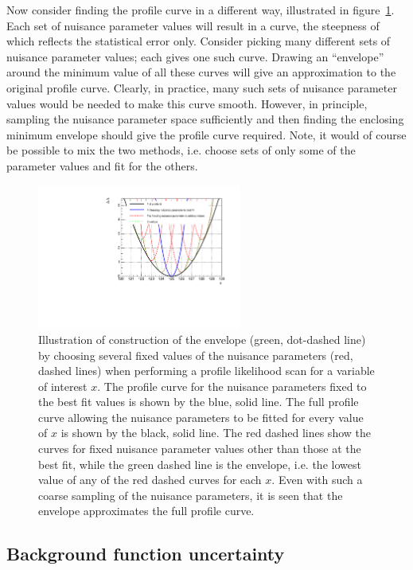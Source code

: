 Now consider finding the profile curve in a different way, illustrated
in figure~\ref{fig:concept:cartoon}.
Each set of nuisance
parameter values will result in a curve, the steepness of which reflects
the statistical error only. Consider picking many different sets of nuisance
parameter values; each gives one such curve. Drawing an ``envelope'' around the
minimum \nll value of all these curves will give an approximation to the
original profile curve. Clearly, in practice, many such sets of nuisance
parameter values would be needed to make this curve smooth. However, in
principle, sampling the nuisance parameter space sufficiently
and then finding the enclosing
minimum envelope should give the profile curve required.
Note, it would of course be possible to mix the two methods, i.e.
choose sets of only some of the parameter values and fit for the others.
%
\begin{figure}[tbp]
\centering
\includegraphics[width=0.6\textwidth]{concept/envelope_cartoon.pdf}
\caption{Illustration of construction of the envelope (green, dot-dashed line)
by choosing several fixed values of the nuisance parameters (red, dashed lines)
when performing a profile likelihood scan for a variable of interest $x$.
The \nll profile curve for the nuisance parameters fixed to the best fit
values is shown by the blue, solid line. The full profile curve allowing the
nuisance parameters to be fitted for every value of $x$ is shown by the
black, solid line. The red dashed lines show the \nll curves for fixed
nuisance parameter values other than those at the best fit, while the green
dashed line is the envelope, i.e. the lowest value of any of the red dashed
curves for each $x$. Even with such a coarse sampling of the nuisance
parameters, it is seen that the envelope approximates the full profile curve.}
\label{fig:concept:cartoon}
\end{figure}

\subsection{Background function uncertainty}
\label{sec:concept:functions}

